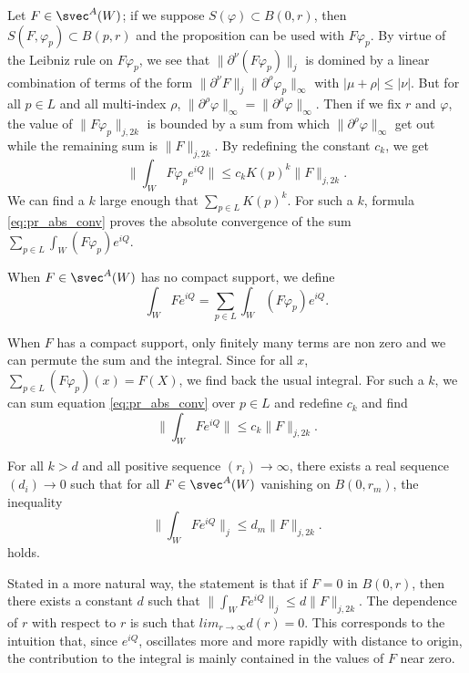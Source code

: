 Let $F\in\svec^A(W)$; if we suppose $S(\varphi)\subset B(0,r)$, then $S(F,\varphi_p)\subset B(p,r)$ and the proposition can be used with $F\varphi_p$. By virtue of the Leibniz rule on $F\varphi_p$, we see that $\| \partial^{\nu}(F\varphi_p) \|_j$ is domined by a linear combination of terms of the form $\| \partial^{\nu}F \|_j\| \partial^{\rho}\varphi_p \|_{\infty}$ with $| \mu+\rho |\leq | \nu |$. But for all $p\in L$ and all multi-index $\rho$, $\| \partial^{\rho}\varphi \|_{\infty}=\| \partial^{\rho}\varphi \|_{\infty}$. Then if we fix $r$ and $\varphi$, the value of $\| F\varphi_p \|_{j,2k}$ is bounded by a sum from which  $\| \partial^{\rho}\varphi \|_{\infty}$ get out while the remaining sum is $\| F \|_{j,2k}$. By redefining the constant $c_k$, we get
\begin{equation} \label{eq:pr_abs_conv}
	\| \int_WF\varphi_pe^{iQ} \|\leq c_kK(p)^k\| F \|_{j,2k}.
\end{equation}
We can find a $k$ large enough that $\sum_{p\in L}K(p)^k$. For such a $k$, formula \eqref{eq:pr_abs_conv} proves the absolute convergence of the sum $\sum_{p\in L}\int_W(F\varphi_p)e^{iQ}$.

\begin{definition} \label{def:intFeiQ}
	When $F\in\svec^A(W)$ has no compact support, we define
	\begin{equation}
		\int_WFe^{iQ}=\sum_{p\in L}\int_W(F\varphi_p)e^{iQ}.
	\end{equation}

\end{definition}
When $F$ has a compact support, only finitely many terms are non zero and we can permute the sum and the integral. Since for all $x$, $\sum_{p\in L}(F\varphi_p)(x)=F(X)$, we find back the usual integral. For such a $k$, we can sum equation \eqref{eq:pr_abs_conv} over $p\in L$ and redefine $c_k$ and find
\[
	\| \int_W Fe^{iQ} \|\leq c_k\| F \|_{j,2k}.
\]

\begin{proposition}   \label{prop:leqd_m}
	For all $k>d$ and all positive sequence $(r_i)\to\infty$, there exists a real sequence $(d_i)\to 0$ such that for all $F\in\svec^A(W)$ vanishing on $B(0,r_m)$, the inequality
	\[
		\| \int_WFe^{iQ} \|_j\leq d_m\| F \|_{j,2k}.
	\]
	holds.
\end{proposition}

Stated in a more natural way, the statement is that if $F=0$ in $B(0,r)$, then there exists a constant $d$ such that $\| \int_WFe^{iQ} \|_j\leq d\| F \|_{j,2k}$. The dependence of $r$ with respect to $r$ is such that $lim_{r\to\infty}d(r)=0$. This corresponds to the intuition that, since $e^{iQ}$, oscillates more and more rapidly with distance to origin, the contribution to the integral is mainly contained in the values of $F$ near zero.

